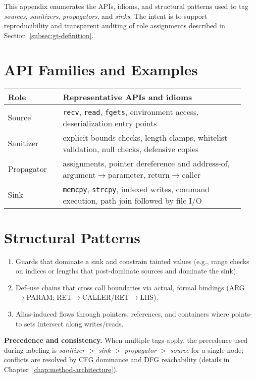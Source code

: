 \documentclass{buthesis}
\begin{document}
\begin{appendices}
This appendix enumerates the APIs, idioms, and structural patterns used to tag
\emph{sources}, \emph{sanitizers}, \emph{propagators}, and \emph{sinks}. The intent is to
support reproducibility and transparent auditing of role assignments described
in Section~\ref{subsec:gt-definition}.

\section{API Families and Examples}
\begin{tabular}{p{0.22\linewidth} p{0.73\linewidth}}
\toprule
\textbf{Role} & \textbf{Representative APIs and idioms} \\
\midrule
Source & \texttt{recv}, \texttt{read}, \texttt{fgets}, environment access, deserialization entry points \\
Sanitizer & explicit bounds checks, length clamps, whitelist validation, null checks, defensive copies \\
Propagator & assignments, pointer dereference and address-of, argument$\rightarrow$parameter, return$\rightarrow$caller \\
Sink & \texttt{memcpy}, \texttt{strcpy}, indexed writes, command execution, path join followed by file I/O \\
\bottomrule
\end{tabular}

\section{Structural Patterns}
\begin{enumerate}
  \item Guards that dominate a sink and constrain tainted values (e.g., range checks
        on indices or lengths that post-dominate sources and dominate the sink).
  \item Def–use chains that cross call boundaries via actual, formal bindings
        (ARG$\rightarrow$PARAM; RET$\rightarrow$CALLER/RET$\rightarrow$LHS).
  \item Alias-induced flows through pointers, references, and containers where
        points-to sets intersect along writes/reads.
\end{enumerate}

\noindent\textbf{Precedence and consistency.}
When multiple tags apply, the precedence used during labeling is
\emph{sanitizer} $>$ \emph{sink} $>$ \emph{propagator} $>$ \emph{source} for a single node; conflicts are
resolved by CFG dominance and DFG reachability (details in Chapter~\ref{chap:method-architecture}).


\end{appendices}
\end{document}
